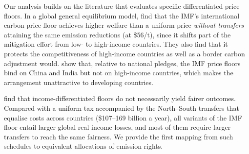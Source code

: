 \documentclass[12pt,english]{article}
\theoremstyle{remark}
\begin{document}
Our analysis builds on the literature that evaluates specific differentiated price floors. %
In a global general equilibrium model, \citet{chateau_global_2024} find that the IMF's international carbon price floor \citep{parry_proposal_2021} achieves higher welfare than a uniform price \textit{without transfers} attaining the same emission reductions (at \$56/t), since it shifts part of the mitigation effort from low- to high-income countries. They also find that it protects the competitiveness of high-income countries as well as a border carbon adjustment would. \citet{he_analysis_2024} show that, relative to national pledges, the IMF price floors bind on China and India but not on high-income countries, which makes the arrangement unattractive to developing countries. 

\citet{le_moigne_distributional_2026} find that income-differentiated floors do not necessarily yield fairer outcomes. Compared with a uniform tax accompanied by the North--South transfers that equalise costs across countries (\$107--169 billion a year), all variants of the IMF floor entail larger global real-income losses, and most of them require larger transfers to reach the same fairness. We provide the first mapping from such schedules to equivalent allocations of emission rights. %
\end{document}
